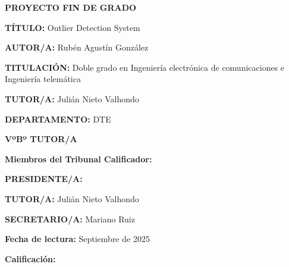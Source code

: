 \vspace{7cm}
\begin{center}
	{\fontsize{20}{24} \textbf{PROYECTO FIN DE GRADO} } \\
	
\end{center}
\vspace{1,3cm}
\begin{adjustwidth}{4cm}{3cm}
	{\setlength{\parskip}{0pt} \setlength{\parindent}{0pt}

{\fontsize{11}{13,2}
	{\textbf{TÍTULO:} Outlier Detection System}\vspace{19pt}
	
	{\textbf{AUTOR/A:} Rubén Agustín González }\vspace{19pt}
	
	{\textbf{TITULACIÓN:} Doble grado en Ingeniería electrónica de comunicaciones e Ingeniería telemática }\vspace{19pt}
	
	{\textbf{TUTOR/A:} Julián Nieto Valhondo} \vspace{19pt}
	
	{\textbf{DEPARTAMENTO:} DTE}\vspace{19pt}
	
	\hspace*{\fill}	{\textbf{VºBº TUTOR/A}  }\vspace{17pt}
	
	{\textbf{Miembros del Tribunal Calificador:}}\vspace{19pt}
	
	{\textbf{PRESIDENTE/A:} }\vspace{19pt}
	
	{\textbf{TUTOR/A:} Julián Nieto Valhondo}\vspace{19pt}
	
	{\textbf{SECRETARIO/A:} Mariano Ruiz}\vspace{19pt}
	
	{\textbf{Fecha de lectura:} Septiembre de 2025}\vspace{19pt}
	
	{\textbf{Calificación:} }\vspace{19pt}
	
	\vspace{19pt}
}
}
\end{adjustwidth}

\restoregeometry